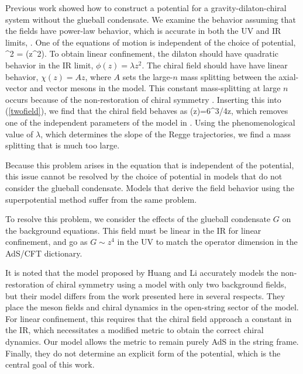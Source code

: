 Previous work showed how to construct a potential for a gravity-dilaton-chiral system without the glueball condensate. 
We examine the behavior assuming that the fields have power-law behavior, which is accurate in both the UV and IR limits, \cite{Springer2010}. 
One of the equations of motion is independent of the choice of potential,
\be
\chidot^2  =  \Dz(z^2\phidot). 
\label{twofield}
\ee
To obtain linear confinement, the dilaton should have quadratic behavior in the IR limit, $\phi(z)=\lambda z^2$.
The chiral field should have have linear behavior, $\chi(z)=A z$, where $A$ sets the large-$n$ mass splitting between the axial-vector and vector mesons in the model. 
This constant mass-splitting at large $n$ occurs because of the non-restoration of chiral symmetry \cite{Shifman-2008}.
Inserting this into (\ref{twofield}), we find that the chiral field behaves as
\be
\chi(z)=6^{3/4}\sqrt{\lambda}z,
\ee
which removes one of the independent parameters of the model in \cite{gherghetta-kelley}. 
Using the phenomenological value of $\lambda$, which determines the slope of the Regge trajectories, we find a mass splitting that is much too large.

Because this problem arises in the equation that is independent of the potential, this issue cannot be resolved by the choice of potential in models that do not consider the glueball condensate. 
Models that derive the field behavior using the superpotential method suffer from the same problem.

To resolve this problem, we consider the effects of the glueball condensate $G$ on the background equations. 
This field must be linear in the IR for linear confinement, and go as $G \sim z^4$ in the UV to match the operator dimension in the AdS/CFT dictionary.

It is noted that the model proposed by Huang and Li \cite{Li2013, Li2013a} accurately models the non-restoration of chiral symmetry using a model with only two background fields, but their model differs from the work presented here in several respects.
They place the meson fields and chiral dynamics in the open-string sector of the model. 
For linear confinement, this requires that the chiral field approach a constant in the IR, which necessitates a modified metric to obtain the correct chiral dynamics.
Our model allows the metric to remain purely AdS in the string frame.
Finally, they do not determine an explicit form of the potential, which is the central goal of this work.

